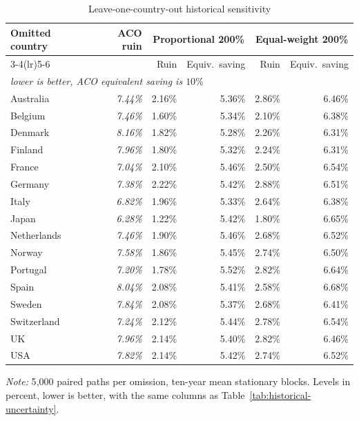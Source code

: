 \begin{table}[H]
\centering
\caption{Leave-one-country-out historical sensitivity}
\label{tab:historical-uncertainty-loo}
\small
\begin{tabular}{lrrrrr}
\toprule
Omitted country & ACO ruin & \multicolumn{2}{c}{Proportional 200\%} & \multicolumn{2}{c}{Equal-weight 200\%} \\
\cmidrule(lr){3-4}\cmidrule(lr){5-6}
 & & Ruin & Equiv.\ saving & Ruin & Equiv.\ saving \\
\multicolumn{6}{l}{\emph{lower is better, ACO equivalent saving is $10\%$}} \\
\midrule
Australia & \emph{7.44\%} & 2.16\% & 5.36\% & 2.86\% & 6.46\% \\
Belgium & \emph{7.46\%} & 1.60\% & 5.34\% & 2.10\% & 6.38\% \\
Denmark & \emph{8.16\%} & 1.82\% & 5.28\% & 2.26\% & 6.31\% \\
Finland & \emph{7.96\%} & 1.80\% & 5.32\% & 2.24\% & 6.31\% \\
France & \emph{7.04\%} & 2.10\% & 5.46\% & 2.50\% & 6.54\% \\
Germany & \emph{7.38\%} & 2.22\% & 5.42\% & 2.88\% & 6.51\% \\
Italy & \emph{6.82\%} & 1.96\% & 5.33\% & 2.64\% & 6.38\% \\
Japan & \emph{6.28\%} & 1.22\% & 5.42\% & 1.80\% & 6.65\% \\
Netherlands & \emph{7.46\%} & 1.90\% & 5.46\% & 2.68\% & 6.52\% \\
Norway & \emph{7.58\%} & 1.86\% & 5.45\% & 2.74\% & 6.50\% \\
Portugal & \emph{7.20\%} & 1.78\% & 5.52\% & 2.82\% & 6.64\% \\
Spain & \emph{8.04\%} & 2.08\% & 5.41\% & 2.58\% & 6.68\% \\
Sweden & \emph{7.84\%} & 2.08\% & 5.37\% & 2.68\% & 6.41\% \\
Switzerland & \emph{7.24\%} & 2.12\% & 5.44\% & 2.78\% & 6.54\% \\
UK & \emph{7.96\%} & 2.14\% & 5.40\% & 2.82\% & 6.46\% \\
USA & \emph{7.82\%} & 2.14\% & 5.42\% & 2.74\% & 6.52\% \\
\bottomrule
\end{tabular}
\begin{minipage}{0.94\textwidth}\footnotesize
\textit{Note:} 5{,}000 paired paths per omission, ten-year mean stationary blocks. Levels in percent, lower is better, with the same columns as Table~\ref{tab:historical-uncertainty}.
\end{minipage}
\end{table}
